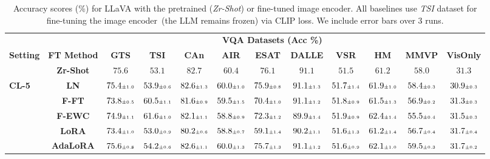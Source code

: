 \begin{table}
\caption{Accuracy scores (\%) for LLaVA with the pretrained (\emph{Zr-Shot}) or fine-tuned image encoder. All baselines use \emph{TSI} dataset for fine-tuning the image encoder~(the LLM remains frozen) via CLIP loss. We include error bars over 3 runs.}
 \label{table:vlm_vqa_acc_tsi_clip}
\vskip 0.15in
\begin{center}
\begin{small}
\begingroup
\setlength{\tabcolsep}{3.9pt}
\begin{tabular}{l c c c c c c c c c c c}
\toprule
 & & \multicolumn{9}{c}{\textbf{VQA Datasets (Acc \%)}}  \\
\cmidrule(lr){3-12}
\textbf{Setting} & \textbf{FT Method}  & \textbf{GTS} & \textbf{TSI} & \textbf{CAn} & \textbf{AIR} & \textbf{ESAT} & \textbf{DALLE} & \textbf{VSR} & \textbf{HM} & \textbf{MMVP} & \textbf{VisOnly} \\
\midrule
 & \textbf{Zr-Shot} & $75.6$ & $53.1$ & $82.7$ & $60.4$ & $76.1$ & $91.1$ & $51.5$ & $61.2$ & $58.0$ & $31.3$ \\
\midrule
\multirow{7}{*}{\textbf{CL-5}} & \textbf{LN} & $75.4 \mbox{\tiny\ensuremath{\pm 1.0}}$ & $53.9 \mbox{\tiny\ensuremath{\pm 0.6}}$ & $82.6 \mbox{\tiny\ensuremath{\pm 1.3}}$ & $60.0 \mbox{\tiny\ensuremath{\pm 1.0}}$ & $75.9 \mbox{\tiny\ensuremath{\pm 0.8}}$ & $91.1 \mbox{\tiny\ensuremath{\pm 1.3}}$ & $51.7 \mbox{\tiny\ensuremath{\pm 1.4}}$ & $61.9 \mbox{\tiny\ensuremath{\pm 1.0}}$ & $58.4 \mbox{\tiny\ensuremath{\pm 0.3}}$ & $30.9 \mbox{\tiny\ensuremath{\pm 0.3}}$ \\
& \textbf{F-FT} & $73.8 \mbox{\tiny\ensuremath{\pm 0.5}}$ & $60.5 \mbox{\tiny\ensuremath{\pm 1.1}}$ & $81.6 \mbox{\tiny\ensuremath{\pm 0.9}}$ & $59.5 \mbox{\tiny\ensuremath{\pm 1.5}}$ & $70.4 \mbox{\tiny\ensuremath{\pm 1.0}}$ & $91.1 \mbox{\tiny\ensuremath{\pm 1.2}}$ & $51.8 \mbox{\tiny\ensuremath{\pm 0.9}}$ & $61.5 \mbox{\tiny\ensuremath{\pm 1.3}}$ & $56.9 \mbox{\tiny\ensuremath{\pm 0.2}}$ & $31.3 \mbox{\tiny\ensuremath{\pm 0.3}}$ \\
& \textbf{F-EWC} & $74.9 \mbox{\tiny\ensuremath{\pm 1.1}}$ & $61.6 \mbox{\tiny\ensuremath{\pm 1.0}}$ & $82.1 \mbox{\tiny\ensuremath{\pm 1.1}}$ & $58.8 \mbox{\tiny\ensuremath{\pm 0.9}}$ & $72.3 \mbox{\tiny\ensuremath{\pm 1.2}}$ & $89.9 \mbox{\tiny\ensuremath{\pm 1.4}}$ & $51.9 \mbox{\tiny\ensuremath{\pm 0.9}}$ & $62.4 \mbox{\tiny\ensuremath{\pm 1.4}}$ & $55.5 \mbox{\tiny\ensuremath{\pm 0.4}}$ & $31.5 \mbox{\tiny\ensuremath{\pm 0.3}}$ \\
& \textbf{LoRA} & $73.4 \mbox{\tiny\ensuremath{\pm 1.0}}$ & $53.0 \mbox{\tiny\ensuremath{\pm 0.9}}$ & $80.2 \mbox{\tiny\ensuremath{\pm 0.6}}$ & $58.8 \mbox{\tiny\ensuremath{\pm 0.7}}$ & $59.1 \mbox{\tiny\ensuremath{\pm 1.4}}$ & $90.2 \mbox{\tiny\ensuremath{\pm 1.1}}$ & $51.6 \mbox{\tiny\ensuremath{\pm 1.3}}$ & $61.2 \mbox{\tiny\ensuremath{\pm 1.4}}$ & $56.7 \mbox{\tiny\ensuremath{\pm 0.4}}$ & $31.7 \mbox{\tiny\ensuremath{\pm 0.4}}$ \\
& \textbf{AdaLoRA} & $75.6 \mbox{\tiny\ensuremath{\pm 0.8}}$ & $54.2 \mbox{\tiny\ensuremath{\pm 0.6}}$ & $82.6 \mbox{\tiny\ensuremath{\pm 1.1}}$ & $60.0 \mbox{\tiny\ensuremath{\pm 1.3}}$ & $75.7 \mbox{\tiny\ensuremath{\pm 1.3}}$ & $91.1 \mbox{\tiny\ensuremath{\pm 1.2}}$ & $51.6 \mbox{\tiny\ensuremath{\pm 0.9}}$ & $62.1 \mbox{\tiny\ensuremath{\pm 1.0}}$ & $59.5 \mbox{\tiny\ensuremath{\pm 0.3}}$ & $31.7 \mbox{\tiny\ensuremath{\pm 0.2}}$ \\

\end{tabular}
\end{small}
\end{center}
\end{table}
